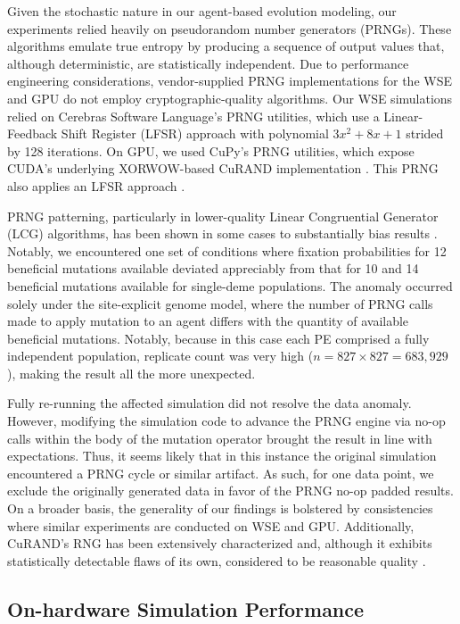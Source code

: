 Given the stochastic nature in our agent-based evolution modeling, our experiments relied heavily on pseudorandom number generators (PRNGs).
These algorithms emulate true entropy by producing a sequence of output values that, although deterministic, are statistically independent.
Due to performance engineering considerations, vendor-supplied PRNG implementations for the WSE and GPU do not employ cryptographic-quality algorithms.
Our WSE simulations relied on Cerebras Software Language's PRNG utilities, which use a Linear-Feedback Shift Register (LFSR) approach with polynomial $3x^2 + 8x + 1$ strided by 128 iterations.
On GPU, we used CuPy's PRNG utilities, which expose CUDA's underlying XORWOW-based CuRAND implementation \citep{marsaglia2003xorshift}.
This PRNG also applies an LFSR approach \citep{brent2004note}.

PRNG patterning, particularly in lower-quality Linear Congruential Generator (LCG) algorithms, has been shown in some cases to substantially bias results \citep{click2010quality}.
Notably, we encountered one set of conditions where fixation probabilities for 12 beneficial mutations available deviated appreciably from that for 10 and 14 beneficial mutations available for single-deme populations.
The anomaly occurred solely under the site-explicit genome model, where the number of PRNG calls made to apply mutation to an agent differs with the quantity of available beneficial mutations.
Notably, because in this case each PE comprised a fully independent population, replicate count was very high ($n = 827 \times 827 = 683,929$), making the result all the more unexpected.

Fully re-running the affected simulation did not resolve the data anomaly.
However, modifying the simulation code to advance the PRNG engine via no-op calls within the body of the mutation operator brought the result in line with expectations.
Thus, it seems likely that in this instance the original simulation encountered a PRNG cycle or similar artifact.
As such, for one data point, we exclude the originally generated data in favor of the  PRNG no-op padded results.
On a broader basis, the generality of our findings is bolstered by consistencies where similar experiments are conducted on WSE and GPU.
Additionally, CuRAND's RNG has been extensively characterized and, although it exhibits statistically detectable flaws of its own, considered to be reasonable quality \citep{nvidia2024curand}.

\subsection{On-hardware Simulation Performance}
\label{sec:performance}

